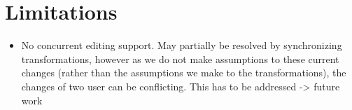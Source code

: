 \section{Limitations}

\begin{itemize}
    \item No concurrent editing support. May partially be resolved by synchronizing transformations, however as we do not make assumptions to these current changes (rather than the assumptions we make to the transformations), the changes of two user can be conflicting. This has to be addressed -> future work
\end{itemize}